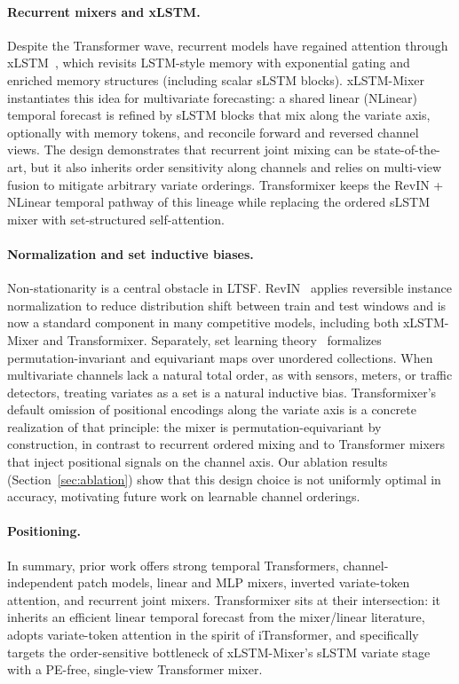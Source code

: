 \documentclass{article}
\begin{document}
\paragraph{Recurrent mixers and xLSTM.}
Despite the Transformer wave, recurrent models have regained attention through xLSTM~\citep{beck2024xlstm}, which revisits LSTM-style memory with exponential gating and enriched memory structures (including scalar sLSTM blocks).
xLSTM-Mixer~\citep{kraus2024xlstmmixer} instantiates this idea for multivariate forecasting: a shared linear (NLinear) temporal forecast is refined by sLSTM blocks that mix along the variate axis, optionally with memory tokens, and reconcile forward and reversed channel views.
The design demonstrates that recurrent joint mixing can be state-of-the-art, but it also inherits order sensitivity along channels and relies on multi-view fusion to mitigate arbitrary variate orderings.
Transformixer keeps the RevIN + NLinear temporal pathway of this lineage while replacing the ordered sLSTM mixer with set-structured self-attention.

\paragraph{Normalization and set inductive biases.}
Non-stationarity is a central obstacle in LTSF.
RevIN~\citep{kim2021revin} applies reversible instance normalization to reduce distribution shift between train and test windows and is now a standard component in many competitive models, including both xLSTM-Mixer and Transformixer.
Separately, set learning theory~\citep{zaheer2017deepsets} formalizes permutation-invariant and equivariant maps over unordered collections.
When multivariate channels lack a natural total order, as with sensors, meters, or traffic detectors, treating variates as a set is a natural inductive bias.
Transformixer's default omission of positional encodings along the variate axis is a concrete realization of that principle: the mixer is permutation-equivariant by construction, in contrast to recurrent ordered mixing and to Transformer mixers that inject positional signals on the channel axis.
Our ablation results (Section~\ref{sec:ablation}) show that this design choice is not uniformly optimal in accuracy, motivating future work on learnable channel orderings.

\paragraph{Positioning.}
In summary, prior work offers strong temporal Transformers, channel-independent patch models, linear and MLP mixers, inverted variate-token attention, and recurrent joint mixers.
Transformixer sits at their intersection: it inherits an efficient linear temporal forecast from the mixer/linear literature, adopts variate-token attention in the spirit of iTransformer, and specifically targets the order-sensitive bottleneck of xLSTM-Mixer's sLSTM variate stage with a PE-free, single-view Transformer mixer.
\end{document}
